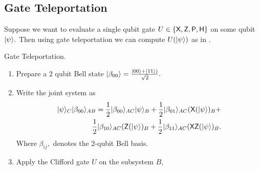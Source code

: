 \begin{definition}



\subsection{Gate Teleportation}
\label{protocol: gate-teleportation}
Suppose we want to evaluate a single qubit gate $U\in\{{\sf X}, {\sf Z}, {\sf P},{\sf H}\}$ on some qubit ${\lvert}\psi\rangle.$ Then using gate teleportation  \cite{GC99} we can compute $U ({\lvert}\psi\rangle)$ as in .
\begin{algorithm}[]
\caption{Gate Teleportation.}
\label{algo:gate-teleport}
\begin{enumerate}
\item  Prepare a $2$ qubit Bell state ${\lvert}\beta_{00}\rangle=\frac{{\lvert}00\rangle+{\lvert}11\rangle)}{\sqrt{2}}.$
\item Write the joint system as
 \begin{equation*}
 \label{eq:telepprtation1}
 \begin{aligned}
{\lvert}\psi\rangle_C {\lvert}\beta_{00}\rangle_{AB}=\frac{1}{2}{\lvert}\beta_{00}\rangle_{AC} {\lvert}\psi\rangle_{B} + \frac{1}{2}{\lvert}\beta_{01}\rangle_{AC} ( {\sf X}( {\lvert}\psi\rangle)_{B}  +\\
 \frac{1}{2}{\lvert}\beta_{10}\rangle_{AC} ( {\sf Z}( {\lvert}\psi\rangle)_{B} + \frac{1}{2}{\lvert}\beta_{11}\rangle_{AC} ( {\sf X} {\sf Z}( {\lvert}\psi\rangle)_{B}.
\end{aligned}
\end{equation*}
 Where $\beta_{ij},$  denotes the 2-qubit Bell basis.
\item Apply the Clifford gate $U$ on the subsystem $B,$
 \begin{equation*}
  \label{eq:telepprtation2}

\end{equation*}
\end{enumerate}
\end{algorithm}
\end{definition}
